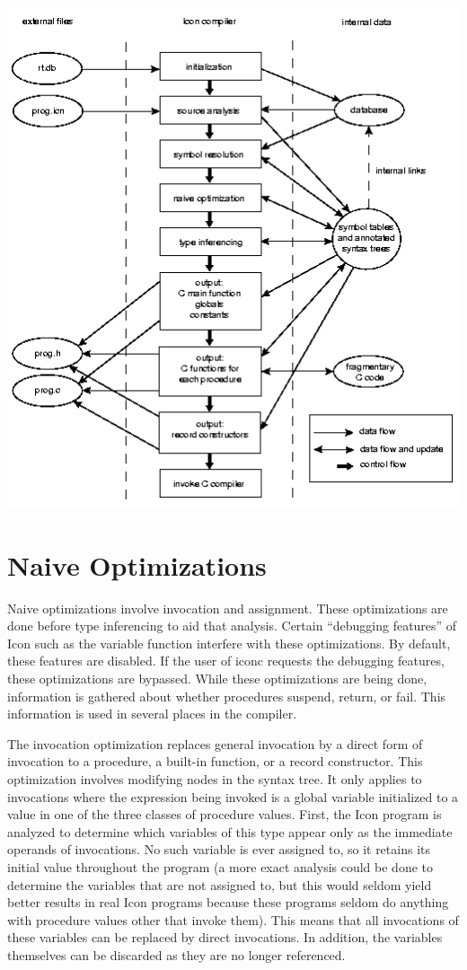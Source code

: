 \includegraphics[width=5.5484in,height=5.822in]{kw/figure6-1.png}  


\section{Naive Optimizations}

Naive optimizations involve invocation and assignment. These
optimizations are done before type inferencing to aid that
analysis. Certain ``debugging features'' of Icon such as the
variable function interfere with these optimizations. By default,
these features are disabled. If the user of iconc requests the
debugging features, these optimizations are bypassed. While these
optimizations are being done, information is gathered about whether
procedures suspend, return, or fail. This information is used in
several places in the compiler.

The invocation optimization replaces general invocation by a direct
form of invocation to a procedure, a built-in function, or a record
constructor. This optimization involves modifying nodes in the syntax
tree. It only applies to invocations where the expression being
invoked is a global variable initialized to a value in one of the
three classes of procedure values. First, the Icon program is analyzed
to determine which variables of this type appear only as the immediate
operands of invocations. No such variable is ever assigned to, so it
retains its initial value throughout the program (a more exact
analysis could be done to determine the variables that are not
assigned to, but this would seldom yield better results in real Icon
programs because these programs seldom do anything with procedure
values other that invoke them). This means that all invocations of
these variables can be replaced by direct invocations. In addition,
the variables themselves can be discarded as they are no longer
referenced.

